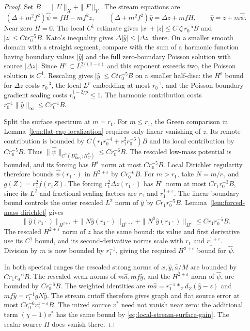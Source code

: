 \documentclass[11pt]{amsart}
\theoremstyle{definition}
\theoremstyle{remark}
\theoremstyle{plain}
\begin{document}
\begin{proof}
Set $B=\|U\|_X+\|F\|_Y$. The stream equations are
\[
 (\Delta+m^2f^2)\widehat\psi=fH-mf^2z,\qquad
 (\Delta+m^2f^2)\widehat y=\Delta z+mfH,\qquad
 \widehat y=z+m\widehat\psi .
\]
Near zero $H=0$. The local $C^1$ estimate gives
$|x|+|z|\leq C|\zeta|r_0^{-5}B$ and
$|z|\leq Ct r_0^{-5}B$. Kato's inequality gives
$\Delta|\widehat y|\leq|\Delta z|$ there. On a smaller
smooth domain with a straight segment, compare with the
sum of a harmonic function having boundary values
$|\widehat y|$ and the full zero-boundary Poisson solution
with source $|\Delta z|$. Since
$H^\varepsilon\subset L^{2/(1-\varepsilon)}$ and this
exponent exceeds two, the Poisson solution is $C^1$.
Rescaling gives
$|\widehat y|\leq Ct r_0^{-5}B$ on a smaller half-disc:
the $H^\varepsilon$ bound for $\Delta z$ costs $r_0^{-3}$,
the local $L^p$ embedding at most $r_0^{-1}$, and the
Poisson boundary-gradient scaling costs
$r_0^{1-2/p}\leq1$. The harmonic contribution costs
$r_0^{-1}\|\widehat y\|_\infty\leq Cr_0^{-1}B$.

Split the surface spectrum at $m=r_1$.
For $m\leq r_1$, the Green comparison in
Lemma~\ref{lem:flat-cap-localization} requires only linear
vanishing of $z$. Its remote contribution is bounded by
$C(r_1r_0^{-4}+r_1^2r_0^{-6})B$ and its local contribution
by $Cr_0^{-5}B$. Thus
$\|\widehat\psi\|_{C^0(D_{64r_1}^+;H_\Sigma^k)}
\leq Cr_0^{-6}B$. The rescaled low-mass potential is
bounded, and its forcing has $H^\varepsilon$ norm at most
$Cr_0^{-5}B$. Local Dirichlet regularity therefore bounds
$\widehat\psi(r_1\cdot)$ in $H^{2+\varepsilon}$ by
$Cr_0^{-6}B$.
For $m>r_1$, take $N=m/r_1$ and
$g(Z)=r_1^2f(r_1Z)$. The forcing
$r_1^2\Delta z(r_1\cdot)$ has $H^\varepsilon$ norm at
most $Cr_1r_0^{-3}B$, since its $L^2$ and fractional
scaling factors are $r_1$ and $r_1^{1+\varepsilon}$.
The linear boundary bound controls the outer rescaled
$L^2$ norm of $\widehat y$ by $Cr_1r_0^{-5}B$.
Lemma~\ref{lem:forced-mass-dirichlet} gives
\[
 \|\widehat y(r_1\cdot)\|_{H^{2+\varepsilon}}
 +\|N\widehat y(r_1\cdot)\|_{H^{1+\varepsilon}}
 +\|N^2\widehat y(r_1\cdot)\|_{H^\varepsilon}
 \leq Cr_1r_0^{-5}B.
\]
The rescaled $H^{2+\varepsilon}$ norm of $z$ has the same
bound: its value and first derivative use its $C^1$ bound,
and its second-derivative norms scale with $r_1$ and
$r_1^{1+\varepsilon}$. Division by $m$ is now bounded by
$r_1^{-1}$, giving the required $H^{2+\varepsilon}$
bound for $\widehat\psi$.

In both spectral ranges the rescaled strong norms of
$x,\widehat y,\widehat a/M$ are bounded by $Cr_1r_0^{-6}B$.
The rescaled weak norms of $m\widehat a,mf\widehat y$,
and the $H^{2+\varepsilon}$ norm of $\widehat\psi$,
are bounded by $Cr_0^{-6}B$. The weighted identities are
$m\widehat a=r_1^{-1}*_Zd_Z(\widehat y-z)$ and
$mf\widehat y=r_1^{-1}gN\widehat y$.
The stream cutoff therefore gives graph and flat source
error at most $Cr_0^{-6}r_1^{1-\varepsilon}B$.
The mixed source $v^*$ need not vanish near zero:
the additional term $(\chi-1)v^*$ has the same bound
by \eqref{eq:local-stream-surface-gain}. The scalar source
$H$ does vanish there.


\end{proof}
\end{document}
